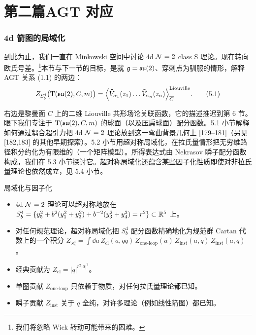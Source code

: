 \part{第二篇\quad AGT 对应}

\section{4d 箭图的局域化}

到此为止，我们一直在 Minkowski 空间中讨论 4d $\mathcal{N}=2$ class S 理论。现在转向欧氏号差。\footnote{我们将忽略 Wick 转动可能带来的困难。}本节与下一节的目标，是就 $\mathfrak{g}=\mathfrak{su}(2)$、穿刺点为驯服的情形，解释 AGT 关系 (1.1) 的两边：
\begin{equation}
  Z_{S^4_b}\big(\mathrm{T}(\mathfrak{su}(2),C,m)\big)
  =\Big\langle\widehat{V}_{\alpha_1}(z_1)\dots\widehat{V}_{\alpha_n}(z_n)\Big\rangle^{\mathrm{Liouville}}_{\overline{C}}.
  \tag{5.1}
\end{equation}


右边是黎曼面 $C$ 上的二维 Liouville 共形场论关联函数，它的描述推迟到第 6 节。眼下我们专注于 $\mathrm{T}(\mathfrak{su}(2),C,m)$ 的球面（以及压扁球面）配分函数。5.1 小节解释如何通过耦合超引力把 4d $\mathcal{N}=2$ 理论放到这一弯曲背景几何上 [179--181]（另见 [182,183] 的其他早期探索）。5.2 小节用超对称局域化，在拉氏量情形把无穷维路径积分约化为有限维的（一个矩阵模型）。所得表达式由 Nekrasov 瞬子配分函数构成，我们在 5.3 小节探讨它。超对称局域化还蕴含某些因子化性质即使对非拉氏量理论也依然成立，见 5.4 小节。

\begin{keybox}{局域化与因子化}
\begin{itemize}[leftmargin=1.4em,itemsep=1pt,topsep=1pt]
\item 4d $\mathcal{N}=2$ 理论可以超对称地放在
  $S^4_b=\{y_5^2+b^2(y_1^2+y_2^2)+b^{-2}(y_3^2+y_4^2)=r^2\}\subset\mathbb{R}^5$ 上。
\item 对任何规范理论，超对称局域化把 $S^4_b$ 配分函数精确地化为规范群 Cartan 代数上的一个积分
  $Z_{S^4_b}=\int\dd a\,Z_{\mathrm{cl}}(a,q\bar q)\,Z_{\text{one-loop}}(a)\,Z_{\mathrm{inst}}(a,q)\,Z_{\mathrm{inst}}(a,\bar q)$。
\item 经典贡献为 $Z_{\mathrm{cl}}=|q|^{r^2|a|^2}$。
\item 单圈贡献 $Z_{\text{one-loop}}$ 只依赖于物质，对任何拉氏量理论都已知。
\item 瞬子贡献 $Z_{\mathrm{inst}}$ 关于 $q$ 全纯，对许多理论（例如线性箭图）都已知。
\end{itemize}
\end{keybox}

